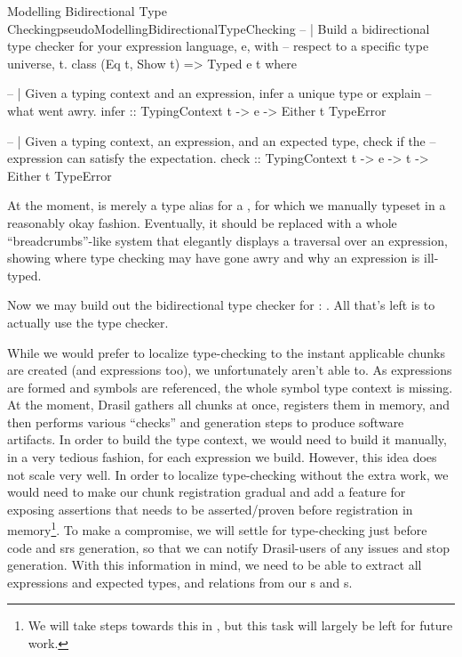 \begin{pseudohaskell}{Modelling Bidirectional Type Checking}{pseudoModellingBidirectionalTypeChecking}
-- | Build a bidirectional type checker for your expression language, e, with
--   respect to a specific type universe, t.
class (Eq t, Show t) => Typed e t where
  
  -- | Given a typing context and an expression, infer a unique type or explain
  --   what went awry.
  infer :: TypingContext t -> e -> Either t TypeError

  -- | Given a typing context, an expression, and an expected type, check if the
  --   expression can satisfy the expectation.
  check :: TypingContext t -> e -> t -> Either t TypeError
\end{pseudohaskell}

At the moment,  is merely a type alias for a
, for which we manually typeset in a reasonably okay fashion.
Eventually, it should be replaced with a whole ``breadcrumbs''-like system that
elegantly displays a traversal over an expression, showing where type checking
may have gone awry and why an expression is ill-typed.

Now we may build out the bidirectional type checker for \Expr{}: . All that's left is to
actually use the type checker.

While we would prefer to localize type-checking to the instant applicable chunks
are created (and expressions too), we unfortunately aren't able to. As
expressions are formed and symbols are referenced, the whole symbol type context
is missing. At the moment, Drasil gathers all chunks at once, registers them in
memory, and then performs various ``checks'' and generation steps to produce
software artifacts. In order to build the type context, we would need to build
it manually, in a very tedious fashion, for each expression we build. However,
this idea does not scale very well. In order to localize type-checking without
the extra work, we would need to make our chunk registration gradual and add a
feature for exposing assertions that needs to be asserted/proven before
registration in memory\footnote{We will take steps towards this in
, but this task will largely be left for future work.}.
To make a compromise, we will settle for type-checking just before code and
\acs{srs} generation, so that we can notify Drasil-users of any issues and stop
generation. With this information in mind, we need to be able to extract all
expressions and expected types, and relations from our \InstanceModel{}s and
\DataDefinition{}s.

